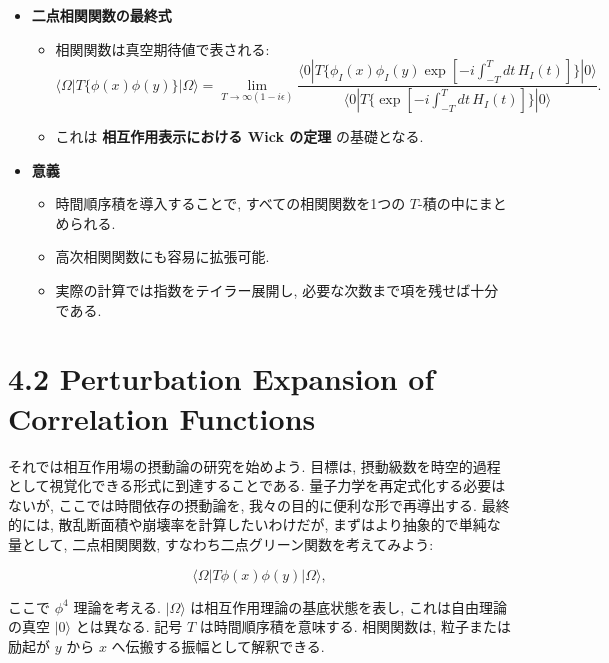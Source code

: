 \documentclass[a4paper,12pt]{article}
\begin{document}
\begin{itemize}
  \item \textbf{二点相関関数の最終式}
  \begin{itemize}
    \item 相関関数は真空期待値で表される:
    \begin{equation*}
      \langle \Omega | T\{\phi(x)\phi(y)\} | \Omega \rangle
      = \lim_{T \to \infty (1-i\epsilon)}
      \frac{\langle 0 | T \{ \phi_I(x)\phi_I(y)\exp[-i\int_{-T}^T dt\, H_I(t)] \} | 0 \rangle}
      {\langle 0 | T \{ \exp[-i\int_{-T}^T dt\, H_I(t)] \} | 0 \rangle}.
    \end{equation*}
    \item これは \textbf{相互作用表示における Wick の定理} の基礎となる.
  \end{itemize}

  \item \textbf{意義}
  \begin{itemize}
    \item 時間順序積を導入することで, すべての相関関数を1つの $T$-積の中にまとめられる.
    \item 高次相関関数にも容易に拡張可能.
    \item 実際の計算では指数をテイラー展開し, 必要な次数まで項を残せば十分である.
  \end{itemize}

\end{itemize}
\newpage
\color{black}
\section*{4.2 Perturbation Expansion of Correlation Functions}

それでは相互作用場の摂動論の研究を始めよう. 
目標は, 摂動級数を時空的過程として視覚化できる形式に到達することである. 
量子力学を再定式化する必要はないが, ここでは時間依存の摂動論を, 我々の目的に便利な形で再導出する. 
最終的には, 散乱断面積や崩壊率を計算したいわけだが, 
まずはより抽象的で単純な量として, 二点相関関数, 
すなわち二点グリーン関数を考えてみよう:

\begin{equation*}
\langle \Omega | T \phi(x)\phi(y) | \Omega \rangle ,
\end{equation*}

ここで $\phi^4$ 理論を考える. $\lvert \Omega \rangle$ は相互作用理論の基底状態を表し, 
これは自由理論の真空 $\lvert 0 \rangle$ とは異なる. 
記号 $T$ は時間順序積を意味する. 
相関関数は, 粒子または励起が $y$ から $x$ へ伝搬する振幅として解釈できる.
\end{document}
